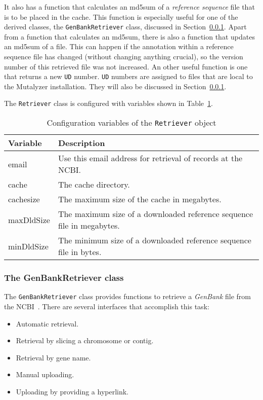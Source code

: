 \documentclass{article}
\begin{document}
It also has a function that calculates an md5sum of a \emph{reference sequence}
file that is to be placed in the cache. This function is especially useful for
one of the derived classes, the \texttt{GenBankRetriever} class, discussed
in Section~\ref{subsubsec:genbankretriever}. Apart from a function that calculates an md5sum, there is also a
function that updates an md5sum of a file. This can happen if the annotation
within a reference sequence file has changed (without changing anything
crucial), so the version number of this retrieved file was not increased. An
other useful function is one that returns a new \texttt{UD} number. \texttt{UD}
numbers are assigned to files that are local to the Mutalyzer installation.
They will also be discussed in Section~\ref{subsubsec:genbankretriever}.

The \texttt{Retriever} class is configured with variables shown in
Table~\ref{tab:retrieverconfig}.

\begin{table}[H]
\begin{center}
\begin{tabular}{l|p{9cm}}
Variable   & Description \\
\hline
email      & Use this email address for retrieval of records at the NCBI. \\
cache      & The cache directory. \\
cachesize  & The maximum size of the cache in megabytes. \\
maxDldSize & The maximum size of a downloaded reference sequence file in
             megabytes. \\
minDldSize & The minimum size of a downloaded reference sequence file in bytes.
\end{tabular}
\caption{Configuration variables of the \texttt{Retriever} object}
\label{tab:retrieverconfig}
\end{center}
\end{table}

\subsubsection{The GenBankRetriever class} \label{subsubsec:genbankretriever}
The \texttt{GenBankRetriever} class provides functions to retrieve a
\emph{GenBank} file from the NCBI~\cite{NCBI}. There are several interfaces
that accomplish this task:

\begin{itemize}
\item Automatic retrieval.
\item Retrieval by slicing a chromosome or contig.
\item Retrieval by gene name.
\item Manual uploading.
\item Uploading by providing a hyperlink.
\end{itemize}
\end{document}
